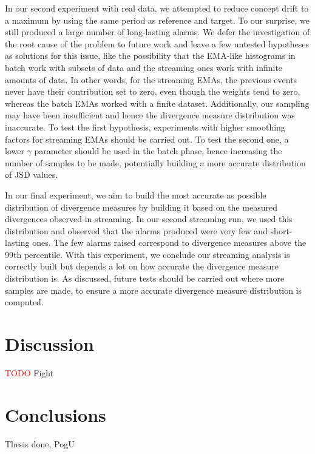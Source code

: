 \documentclass[sigconf]{acmart}
\begin{document}
In our second experiment with real data, we attempted to reduce concept drift to a maximum by using the same period as reference and target. To our surprise, we still produced a large number of long-lasting alarms. We defer the investigation of the root cause of the problem to future work and leave a few untested hypotheses as solutions for this issue, like the possibility that the EMA-like histograms in batch work with subsets of data and the streaming ones work with infinite amounts of data. In other words, for the streaming EMAs, the previous events never have their contribution set to zero, even though the weights tend to zero, whereas the batch EMAs worked with a finite dataset. Additionally, our sampling may have been insufficient and hence the divergence measure distribution was inaccurate. To test the first hypothesis, experiments with higher smoothing factors for streaming EMAs should be carried out. To test the second one, a lower $\gamma$ parameter should be used in the batch phase, hence increasing the number of samples to be made, potentially building a more accurate distribution of JSD values.

In our final experiment, we aim to build the most accurate as possible distribution of divergence measures by building it based on the measured divergences observed in streaming. In our second streaming run, we used this distribution and observed that the alarms produced were very few and short-lasting ones. The few alarms raised correspond to divergence measures above the 99th percentile. With this experiment, we conclude our streaming analysis is correctly built but depends a lot on how accurate the divergence measure distribution is. As discussed, future tests should be carried out where more samples are made, to ensure a more accurate divergence measure distribution is computed.



\section{Discussion}
\label{sec:Discussion}
\textcolor{red}{TODO}
Fight

\section{Conclusions}
\label{sec:Conclusions}
Thesis done, PogU





\end{document}

